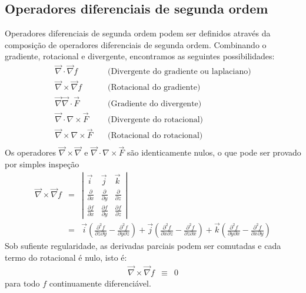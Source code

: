\subsection{Operadores diferenciais de segunda ordem}
Operadores diferenciais de segunda ordem podem ser definidos através da composição de operadores diferenciais de segunda ordem. Combinando o gradiente, rotacional e divergente, encontramos as seguintes possibilidades:
\begin{eqnarray}
  \vec{\nabla} \cdot \vec{\nabla} f&~& \text{(Divergente do gradiente ou laplaciano)}\\
  \vec{\nabla} \times \vec{\nabla} f&~& \text{(Rotacional do gradiente)}\\
  \vec{\nabla} \vec{\nabla}\cdot \vec{F}&~& \text{(Gradiente do divergente)}\\
  \vec{\nabla} \cdot{\nabla}\times \vec{F}&~& \text{(Divergente do rotacional)}\\
  \vec{\nabla} \times{\nabla}\times \vec{F}&~& \text{(Rotacional do rotacional)}\\
  \end{eqnarray}
Os operadores $\vec{\nabla} \times \vec{\nabla}$ e $\vec{\nabla} \cdot{\nabla}\times \vec{F}$ são identicamente nulos, o que pode ser provado por simples inspeção
\begin{eqnarray}
 \vec{\nabla} \times \vec{\nabla} f &=&\left|
 \begin{array}{ccc}
 \vec{i} & \vec{j} & \vec{k} \\
 \frac{\partial}{\partial x} &\frac{\partial}{\partial y} &\frac{\partial}{\partial z} \\
\frac{\partial f}{\partial x} & \frac{\partial f}{\partial y} & \frac{\partial f}{\partial z}
 \end{array}
\right|\\
&=&\vec{i}\left(\frac{\partial^2 f }{\partial z\partial y} - \frac{\partial^2 f}{\partial y\partial z}\right) + \vec{j}\left(\frac{\partial^2 f}{\partial  x\partial z}-\frac{\partial^2f}{\partial z\partial x}\right) + \vec{k}\left(\frac{\partial^2 f}{\partial y\partial x}-\frac{\partial^2 f}{\partial x\partial y}\right)
\end{eqnarray}
Sob sufiente regularidade, as derivadas parciais podem ser comutadas e cada termo do rotacional é nulo, isto é:
\begin{eqnarray}
 \vec{\nabla} \times \vec{\nabla} f &\equiv &0
\end{eqnarray}
 para todo $f$ continuamente diferenciável.
 
